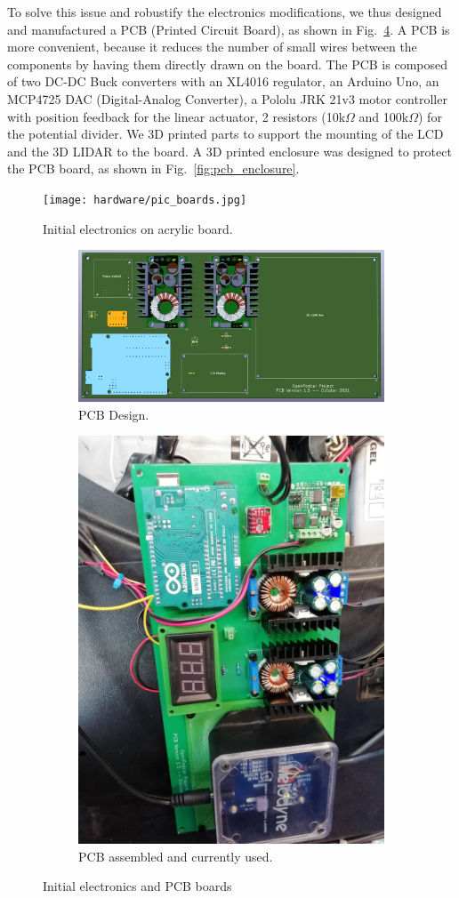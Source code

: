 \documentclass[a4paper]{article}
\begin{document}
To solve this issue and robustify the electronics modifications, we thus designed and manufactured a PCB (Printed Circuit Board), as shown in Fig.~\ref{fig:pcb_assembled}. A PCB is more convenient, because it reduces the number of small wires between the components by having them directly drawn on the board. The PCB is composed of two DC-DC Buck converters with an XL4016 regulator, an Arduino Uno, an MCP4725 DAC (Digital-Analog Converter), a Pololu JRK 21v3 motor controller with position feedback for the linear actuator, 2 resistors (10k$\Omega$ and 100k$\Omega$) for the potential divider. We 3D printed parts to support the mounting of the LCD and the 3D LIDAR to the board. A 3D printed enclosure was designed to protect the PCB board, as shown in Fig.~\ref{fig:pcb_enclosure}.

\begin{figure}
	\centering
	\texttt{[image: hardware/pic\_boards.jpg]}
	\caption{Initial electronics on acrylic board.}
	\label{fig:initial_electronics}
\end{figure}

\begin{figure}
	\centering
	\begin{subfigure}{0.45\textwidth}
		\centering
		\includegraphics[width=\columnwidth]{hardware/pcb_version_1_5_pic1.png}
		\caption{PCB Design.}
		\label{fig:pcb_design}		
	\end{subfigure}
	\quad
	\begin{subfigure}{0.45\textwidth}
		\centering
			\includegraphics[width=0.5\columnwidth, angle=90]{hardware/pcb_podcar.jpg}
			\caption{PCB assembled and currently used.}
			\label{fig:pcb_assembled}
	\end{subfigure}	
	\caption{Initial electronics and PCB boards}
\end{figure}
\end{document}
